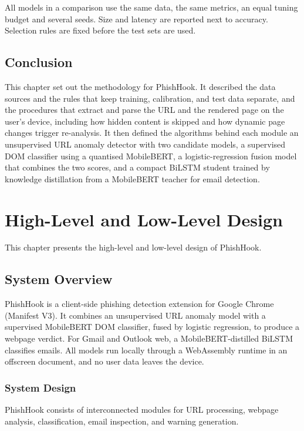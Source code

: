 \documentclass{FastFyp}
\begin{document}
All models in a comparison use the same data, the same metrics, an equal tuning budget and several seeds. Size and latency are reported next to accuracy. Selection rules are fixed before the test sets are used.

\section{Conclusion}
\label{sec:method-conclusion}
This chapter set out the methodology for PhishHook. It described the data sources and the rules that keep training, calibration, and test data separate, and the procedures that extract and parse the URL and the rendered page on the user's device, including how hidden content is skipped and how dynamic page changes trigger re-analysis. It then defined the algorithms behind each module an unsupervised URL anomaly detector with two candidate models, a supervised DOM classifier using a quantised MobileBERT, a logistic-regression fusion model that combines the two scores, and a compact BiLSTM student trained by knowledge distillation from a MobileBERT teacher for email detection.



\chapter{High-Level and Low-Level Design}
\label{ch:design}
This chapter presents the high-level and low-level design of PhishHook. 

\section{System Overview}

PhishHook is a client-side phishing detection extension for Google Chrome (Manifest V3). It combines an unsupervised URL anomaly model with a supervised MobileBERT DOM classifier, fused by logistic regression, to produce a webpage verdict. For Gmail and Outlook web, a MobileBERT-distilled BiLSTM classifies emails. All models run locally through a WebAssembly runtime in an offscreen document, and no user data leaves the device.

\subsection{System Design}

PhishHook consists of interconnected modules for URL processing, webpage analysis, classification, email inspection, and warning generation.
\end{document}
